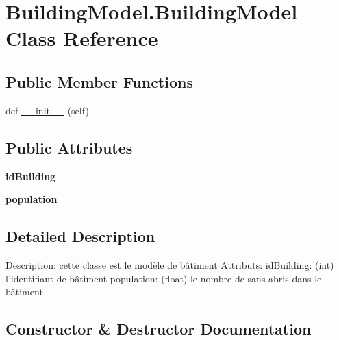 \hypertarget{class_building_model_1_1_building_model}{}\section{Building\+Model.\+Building\+Model Class Reference}
\label{class_building_model_1_1_building_model}
\subsection*{Public Member Functions}
\begin{DoxyCompactItemize}
\item 
def \mbox{\hyperlink{class_building_model_1_1_building_model_a07a46c2f57718514fae93cf26da8c231}{\+\_\+\+\_\+init\+\_\+\+\_\+}} (self)
\end{DoxyCompactItemize}
\subsection*{Public Attributes}
\begin{DoxyCompactItemize}
\item 
\mbox{\label{class_building_model_1_1_building_model_a0f9faaf5977dad07ceee675432ae0ac0}} 
{\bfseries id\+Building}
\item 
\mbox{\label{class_building_model_1_1_building_model_a13cbd7381bf653565e24bff45d0dbe4a}} 
{\bfseries population}
\end{DoxyCompactItemize}


\subsection{Detailed Description}
\begin{DoxyVerb}Description: cette classe est le modèle de bâtiment
Attributs:
    idBuilding: (int) l'identifiant de bâtiment
    population: (float) le nombre de sans-abris dans le bâtiment
\end{DoxyVerb}
 

\subsection{Constructor \& Destructor Documentation}
\mbox{\label{class_building_model_1_1_building_model_a07a46c2f57718514fae93cf26da8c231}} 
